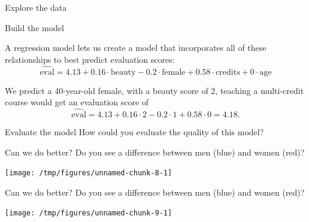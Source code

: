 \documentclass{beamer}\usepackage[]{graphicx}\usepackage[]{color}
\newenvironment{knitrout}{}{} %
\begin{document}
\begin{darkframes}
\begin{frame}{Explore the data}
\begin{knitrout}
\end{knitrout}
    \end{frame}

    \begin{frame}{Build the model}
      
      \begin{center}
        A regression model lets us create a model that incorporates all of these relationships to best predict evaluation scores:
        \[
          \widehat{\text{eval}} =
            4.13 +
            0.16 \cdot \text{beauty} -
            0.2 \cdot \text{female} +
            0.58 \cdot \text{credits} +
            0 \cdot \text{age}
        \]

        \pause

        We predict a 40-year-old female, with a beauty score of 2, teaching a multi-credit course would get an evaluation score of
        \[
          \widehat{\text{eval}} = 4.13 + 0.16 \cdot 2 - 0.2 \cdot 1 + 0.58 \cdot 0 = 4.18.
        \]

      \end{center}
    \end{frame}

    \begin{frame}{Evaluate the model}
      How could you evaluate the quality of this model?
    \end{frame}

    \begin{frame}{Can we do better?}
      Do you see a difference between men (blue) and women (red)?

\begin{knitrout}
\color{fgcolor}
\texttt{[image: /tmp/figures/unnamed-chunk-8-1]} 

\end{knitrout}
    \end{frame}

    \begin{frame}{Can we do better?}
      Do you see a difference between men (blue) and women (red)?

\begin{knitrout}
\color{fgcolor}
\texttt{[image: /tmp/figures/unnamed-chunk-9-1]} 

\end{knitrout}
    \end{frame}


\end{darkframes}
\end{document}
